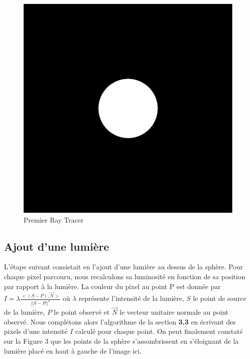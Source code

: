 \documentclass[11pt, oneside]{article}   	%
\begin{document}
\begin{figure}
    \centering
    \includegraphics[scale=0.2]{rapport/result.png}
    \caption{Premier Ray Tracer}
    \label{fig:my_label}
\end{figure}

\subsection{Ajout d'une lumière}
L'étape suivant consistait en l'ajout d'une lumière au dessus de la sphère. Pour chaque pixel parcouru, nous recalculons sa luminosité en fonction de sa position par rapport à la lumière. La couleur du pixel au point P est donnée par $I = \lambda\frac{<(S-P),\vec{N}>}{||S-P||^2}$ où $\lambda$ représente l'intensité de la lumière, $S$ le point de source de la lumière, $P$ le point observé et $\vec{N}$ le vecteur unitaire normale au point observé. Nous complétons alors l'algorithme de la section \textbf{3.3} en écrivant des pixels d'une intensité $I$ calculé pour chaque point. On peut finalement constaté sur la Figure 3 que les points de la  sphère s'assombrissent en s'éloignant de la lumière placé en haut à gauche de l'image ici.
\end{document}
